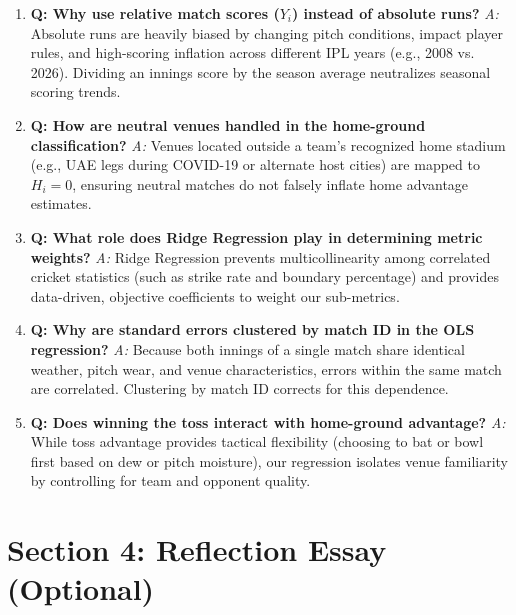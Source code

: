 \documentclass[11pt,a4paper]{article}
\begin{document}
\begin{enumerate}
    \item \textbf{Q: Why use relative match scores ($Y_i$) instead of absolute runs?}  
    \textit{A:} Absolute runs are heavily biased by changing pitch conditions, impact player rules, and high-scoring inflation across different IPL years (e.g., 2008 vs. 2026). Dividing an innings score by the season average neutralizes seasonal scoring trends.
    
    \item \textbf{Q: How are neutral venues handled in the home-ground classification?}  
    \textit{A:} Venues located outside a team's recognized home stadium (e.g., UAE legs during COVID-19 or alternate host cities) are mapped to $H_i = 0$, ensuring neutral matches do not falsely inflate home advantage estimates.
    
    \item \textbf{Q: What role does Ridge Regression play in determining metric weights?}  
    \textit{A:} Ridge Regression prevents multicollinearity among correlated cricket statistics (such as strike rate and boundary percentage) and provides data-driven, objective coefficients to weight our sub-metrics.
    
    \item \textbf{Q: Why are standard errors clustered by match ID in the OLS regression?}  
    \textit{A:} Because both innings of a single match share identical weather, pitch wear, and venue characteristics, errors within the same match are correlated. Clustering by match ID corrects for this dependence.
    
    \item \textbf{Q: Does winning the toss interact with home-ground advantage?}  
    \textit{A:} While toss advantage provides tactical flexibility (choosing to bat or bowl first based on dew or pitch moisture), our regression isolates venue familiarity by controlling for team and opponent quality.
\end{enumerate}

\newpage

\section*{Section 4: Reflection Essay (Optional)}
\end{document}
